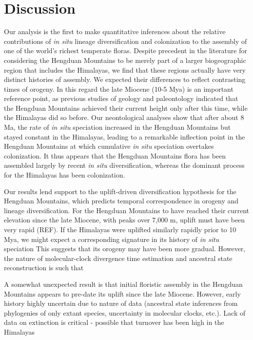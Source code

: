 \section{Discussion}

Our analysis is the first to make quantitative inferences about the relative contributions of \textit{in situ} lineage diversification and colonization to the assembly of one of the world's richest temperate floras. Despite precedent in the literature for considering the Hengduan Mountains to be merely part of a larger biogeographic region that includes the Himalayas, we find that these regions actually have very distinct histories of assembly. We expected their differences to reflect contrasting times of orogeny. In this regard the late Miocene (10-5 Mya) is an important reference point, as previous studies of geology and paleontology indicated that the Hengduan Mountains achieved their current height only after this time, while the Himalayas did so before. Our neontological analyses show that after about 8 Ma, the rate of \textit{in situ} speciation increased in the Hengduan Mountains but stayed constant in the Himalayas, leading to a remarkable inflection point in the Hengduan Mountains at which cumulative \textit{in situ} speciation overtakes colonization. It thus appears that the Hengduan Mountains flora has been assembled largely by recent \textit{in situ} diversification, whereas the dominant process for the Himalayas has been colonization.

Our results lend support to the uplift-driven diversification hypothesis for the Hengduan Mountains, which predicts temporal correspondence in orogeny and lineage diversification. For the Hengduan Mountains to have reached their current elevation since the late Miocene, with peaks over 7,000 m, uplift must have been very rapid (REF). If the Himalayas were uplifted similarly rapidly prior to 10 Mya, we might expect a corresponding signature in its history of \textit{in situ} speciation This suggests that its orogeny may have been more gradual. However, the nature of molecular-clock divergence time estimation and ancestral state reconstruction is such that 

A somewhat unexpected result is that initial floristic assembly in the Hengduan Mountains appears to pre-date its uplift since the late Miocene. However, early history highly uncertain due to nature of data (ancestral state inferences from phylogenies of only extant species, uncertainty in molecular clocks, etc.). Lack of data on extinction is critical - possible that turnover has been high in the Himalayas

